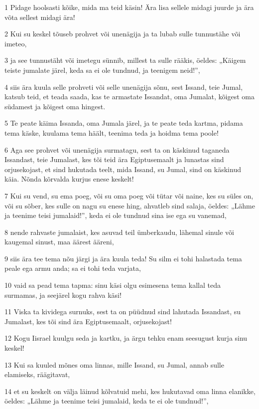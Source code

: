 \par 1 Pidage hoolsasti kõike, mida ma teid käsin! Ära lisa sellele midagi juurde ja ära võta sellest midagi ära!
\par 2 Kui su keskel tõuseb prohvet või unenägija ja ta lubab sulle tunnustähe või imeteo,
\par 3 ja see tunnustäht või imetegu sünnib, millest ta sulle rääkis, öeldes: „Käigem teiste jumalate järel, keda sa ei ole tundnud, ja teenigem neid!”,
\par 4 siis ära kuula selle prohveti või selle unenägija sõnu, sest Issand, teie Jumal, katsub teid, et teada saada, kas te armastate Issandat, oma Jumalat, kõigest oma südamest ja kõigest oma hingest.
\par 5 Te peate käima Issanda, oma Jumala järel, ja te peate teda kartma, pidama tema käske, kuulama tema häält, teenima teda ja hoidma tema poole!
\par 6 Aga see prohvet või unenägija surmatagu, sest ta on käskinud taganeda Issandast, teie Jumalast, kes tõi teid ära Egiptusemaalt ja lunastas sind orjusekojast, et sind hukutada teelt, mida Issand, su Jumal, sind on käskinud käia. Nõnda kõrvalda kurjus enese keskelt!
\par 7 Kui su vend, su ema poeg, või su oma poeg või tütar või naine, kes su süles on, või su sõber, kes sulle on nagu su enese hing, ahvatleb sind salaja, öeldes: „Lähme ja teenime teisi jumalaid!”, keda ei ole tundnud sina ise ega su vanemad,
\par 8 nende rahvaste jumalaist, kes asuvad teil ümberkaudu, lähemal sinule või kaugemal sinust, maa äärest ääreni,
\par 9 siis ära tee tema nõu järgi ja ära kuula teda! Su silm ei tohi halastada tema peale ega armu anda; sa ei tohi teda varjata,
\par 10 vaid sa pead tema tapma: sinu käsi olgu esimesena tema kallal teda surmamas, ja seejärel kogu rahva käsi!
\par 11 Viska ta kividega surnuks, sest ta on püüdnud sind lahutada Issandast, su Jumalast, kes tõi sind ära Egiptusemaalt, orjusekojast!
\par 12 Kogu Iisrael kuulgu seda ja kartku, ja ärgu tehku enam seesugust kurja sinu keskel!
\par 13 Kui sa kuuled mõnes oma linnas, mille Issand, su Jumal, annab sulle elamiseks, räägitavat,
\par 14 et su keskelt on välja läinud kõlvatuid mehi, kes hukutavad oma linna elanikke, öeldes: „Lähme ja teenime teisi jumalaid, keda te ei ole tundnud!”,
